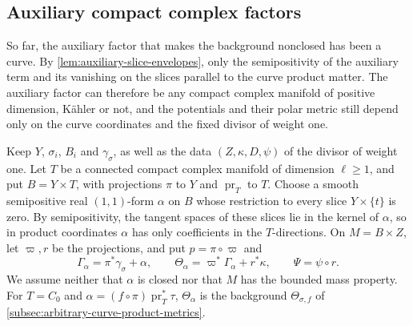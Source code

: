 \subsection{Auxiliary compact complex factors}
\label{subsec:general-auxiliary-product-models}

So far, the auxiliary factor that makes the background nonclosed has been a curve. By \cref{lem:auxiliary-slice-envelopes}, only the semipositivity of the auxiliary term and its vanishing on the slices parallel to the curve product matter. The auxiliary factor can therefore be any compact complex manifold of positive dimension, K\"ahler or not, and the potentials and their polar metric still depend only on the curve coordinates and the fixed divisor of weight one.

Keep $Y$, $\sigma_i$, $B_i$ and $\gamma_\sigma$, as well as the data $(Z,\kappa,D,\psi)$ of the divisor of weight one. Let $T$ be a connected compact complex manifold of dimension $\ell\geq1$, and put $B=Y\times T$, with projections $\pi$ to $Y$ and $\operatorname{pr}_T$ to $T$. Choose a smooth semipositive real $(1,1)$-form $\alpha$ on $B$ whose restriction to every slice $Y\times\{t\}$ is zero. By semipositivity, the tangent spaces of these slices lie in the kernel of $\alpha$, so in product coordinates $\alpha$ has only coefficients in the $T$-directions. On $M=B\times Z$, let $\varpi,r$ be the projections, and put $p=\pi\circ\varpi$ and
\[
 \Gamma_\alpha=\pi^*\gamma_\sigma+\alpha,\qquad
 \Theta_\alpha=\varpi^*\Gamma_\alpha+r^*\kappa,
 \qquad \Psi=\psi\circ r.
\]
We assume neither that $\alpha$ is closed nor that $M$ has the bounded mass property. For $T=C_0$ and $\alpha=(f\circ\pi)\operatorname{pr}_T^*\tau$, $\Theta_\alpha$ is the background $\Theta_{\sigma,f}$ of \cref{subsec:arbitrary-curve-product-metrics}.


